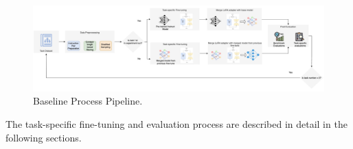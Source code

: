 \begin{figure}
    \centering
    \includegraphics[angle=90, width=1.8\textheight, height=1.8\textwidth, keepaspectratio]
    {Figures/methodology/baseline_process.jpeg}
    \caption{Baseline Process Pipeline.}
    \label{fig:BaselineProcess}
\end{figure}

The task-specific fine-tuning and evaluation process are described in detail in the following sections.

